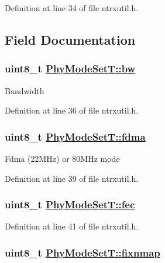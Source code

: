 Definition at line 34 of file ntrxutil.h.

\subsection{Field Documentation}
\hypertarget{structPhyModeSetT_1041f65c103b9effe4227d2875e32707}{
\subsubsection[bw]{\setlength{\rightskip}{0pt plus 5cm}uint8\_\-t \hyperlink{structPhyModeSetT_1041f65c103b9effe4227d2875e32707}{Phy\-Mode\-Set\-T::bw}}}
\label{structPhyModeSetT_1041f65c103b9effe4227d2875e32707}


Bandwidth 

Definition at line 36 of file ntrxutil.h.\hypertarget{structPhyModeSetT_3168873bb8162b95d357e01e2a8886d0}{
\subsubsection[fdma]{\setlength{\rightskip}{0pt plus 5cm}uint8\_\-t \hyperlink{structPhyModeSetT_3168873bb8162b95d357e01e2a8886d0}{Phy\-Mode\-Set\-T::fdma}}}
\label{structPhyModeSetT_3168873bb8162b95d357e01e2a8886d0}


Fdma (22MHz) or 80MHz mode 

Definition at line 39 of file ntrxutil.h.\hypertarget{structPhyModeSetT_53d8f7593c8853dac46867b9ec0c034c}{
\subsubsection[fec]{\setlength{\rightskip}{0pt plus 5cm}uint8\_\-t \hyperlink{structPhyModeSetT_53d8f7593c8853dac46867b9ec0c034c}{Phy\-Mode\-Set\-T::fec}}}
\label{structPhyModeSetT_53d8f7593c8853dac46867b9ec0c034c}




Definition at line 41 of file ntrxutil.h.\hypertarget{structPhyModeSetT_a9fa873508ca6dadecca9e487f8c7dc0}{
\subsubsection[fixnmap]{\setlength{\rightskip}{0pt plus 5cm}uint8\_\-t \hyperlink{structPhyModeSetT_a9fa873508ca6dadecca9e487f8c7dc0}{Phy\-Mode\-Set\-T::fixnmap}}}
\label{structPhyModeSetT_a9fa873508ca6dadecca9e487f8c7dc0}


